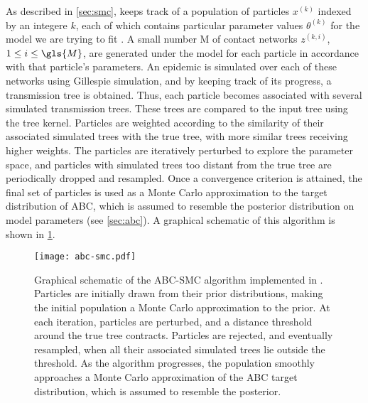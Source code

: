 As described in \cref{sec:smc},  keeps track of a population
of particles $x^{(k)}$ indexed by an integere $k$, each of which contains
particular parameter values $\theta^{(k)}$ for the  model
we are trying to fit . A small number \gls{M} of contact
networks $z^{(k,i)}$, $1 \leq i \leq \gls{M}$, are generated under the model
for each particle in accordance with that particle's parameters. An epidemic is
simulated over each of these networks using Gillespie simulation, and by
keeping track of its progress, a transmission tree is obtained. Thus, each
particle becomes associated with several simulated transmission trees. These
trees are compared to the input tree using the tree kernel. Particles are
weighted according to the similarity of their associated simulated trees with
the true tree, with more similar trees receiving higher weights. The particles
are iteratively perturbed to explore the parameter space, and particles with
simulated trees too distant from the true tree are periodically dropped and
resampled. Once a convergence criterion is attained, the final set of particles
is used as a Monte Carlo approximation to the target distribution of \gls{ABC},
which is assumed to resemble the posterior distribution on model parameters
(see \cref{sec:abc}). A graphical schematic of this algorithm is shown in
\cref{fig:abcsmc}.

\begin{figure}
    \texttt{[image: abc-smc.pdf]}
    \caption[
        Graphical schematic of the ABC-SMC algorithm implemented in .
    ]{
        Graphical schematic of the \gls{ABC}-\gls{SMC} algorithm implemented in
        . Particles are initially drawn from their prior
        distributions, making the initial population a Monte Carlo
        approximation to the prior. At each iteration, particles are perturbed,
        and a distance threshold around the true tree contracts. Particles are
        rejected, and eventually resampled, when all their associated simulated
        trees lie outside the threshold. As the algorithm progresses, the
        population smoothly approaches a Monte Carlo approximation of the
        \gls{ABC} target distribution, which is assumed to resemble the
        posterior.
    }
    \label{fig:abcsmc}
\end{figure}

